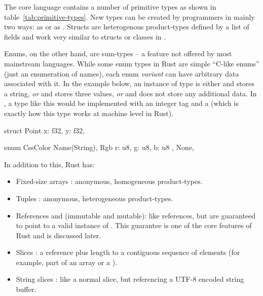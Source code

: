 The core language contains a number of primitive types as shown in table~\ref{tab:primitive-types}.
New types can be created by programmers in mainly two ways: as  or as .
Structs are heterogenous product-types  defined by a list of fields and work very similar to structs or classes in \cpp.

Enums, on the other hand, are sum-types -- a feature not offered by most mainstream languages.
While some enum types in Rust are simple \enquote{C-like enums} (just an enumeration of names), each enum \emph{variant} can have arbitrary data associated with it.
In the example below, an instance of type  is either  and stores a string, \emph{or}  and stores three  values, \emph{or}  and does not store any additional data.
In \cpp, a type like this would be implemented with an integer tag and a  (which is exactly how this type works at machine level in Rust).

\vspace{-3mm}
\begin{center}
\begin{minipage}[t]{.45\textwidth}
\begin{rustcode}
struct Point {
    x: f32,
    y: f32,
}
\end{rustcode}
\end{minipage}
\begin{minipage}[t]{.45\textwidth}
\begin{rustcode}
enum CssColor {
    Name(String),
    Rgb { r: u8, g: u8, b: u8 },
    None,
}
\end{rustcode}
\end{minipage}
\end{center}

In addition to this, Rust has:
\vspace{-3mm}
\begin{itemize}
  \item Fixed-size arrays \code{[T; N]}: anonymous, homogeneous product-types.
  \item Tuples : anonymous, heterogeneous product-types.
  \item References  and  (immutable and mutable): like \cpp references, but are guaranteed to point to a valid instance of .
  This guarantee is one of the core features of Rust and is discussed later.
  \item Slices \code{&[T]}: a reference plus length to a contiguous sequence of elements (for example, part of an array or a ).
  \item String slices : like a normal slice, but referencing a UTF-8 encoded string buffer.
\end{itemize}

